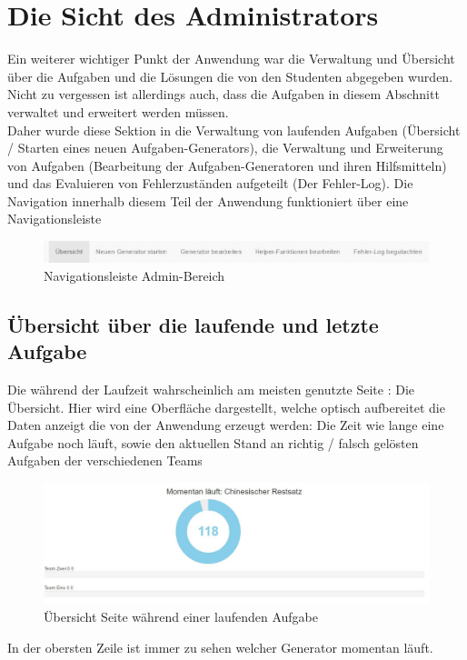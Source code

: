 \section{Die Sicht des Administrators}

Ein weiterer wichtiger Punkt der Anwendung war die Verwaltung und Übersicht über die Aufgaben und die Lösungen die von den Studenten abgegeben wurden. Nicht zu vergessen ist allerdings auch, dass die Aufgaben in diesem Abschnitt verwaltet und erweitert werden müssen. \\
Daher wurde diese Sektion in die Verwaltung von laufenden Aufgaben (Übersicht / Starten eines neuen Aufgaben-Generators), die Verwaltung und Erweiterung von Aufgaben (Bearbeitung der Aufgaben-Generatoren und ihren Hilfsmitteln) und das Evaluieren von Fehlerzuständen aufgeteilt (Der Fehler-Log). Die Navigation innerhalb diesem Teil der Anwendung funktioniert über eine Navigationsleiste \\
\begin{figure}[htp]     %
\centering
\includegraphics[width=1\textwidth]{bilder/NavBar} 
\caption[Navigationsleiste Admin-Bereich]{Navigationsleiste Admin-Bereich}
\end{figure} 

\subsection{Übersicht über die laufende und letzte Aufgabe}

Die während der Laufzeit wahrscheinlich am meisten genutzte Seite : Die Übersicht. Hier wird eine Oberfläche dargestellt, welche optisch aufbereitet die Daten anzeigt die von der Anwendung erzeugt werden: Die Zeit wie lange eine Aufgabe noch läuft, sowie den aktuellen Stand an richtig / falsch gelösten Aufgaben der verschiedenen Teams \\
\begin{figure}[htp]     %
\centering
\includegraphics[width=1\textwidth]{bilder/Overview} 
\caption[Übersicht Seite während einer laufenden Aufgabe]{Übersicht Seite während einer laufenden Aufgabe}
\end{figure} 
In der obersten Zeile ist immer zu sehen welcher Generator momentan läuft.


